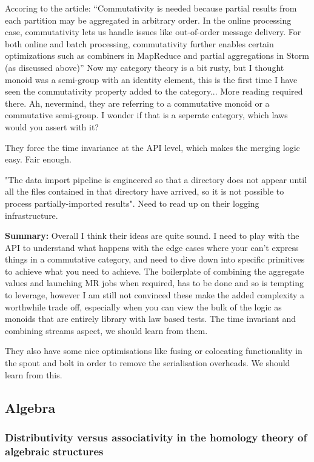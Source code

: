 \documentclass{article}
\begin{document}
Accoring to the article: ``Commutativity is needed because partial results from each partition may be aggregated in arbitrary order.
In the online processing case, commutativity lets us handle issues like out-of-order message delivery. For both online and batch processing, commutativity further enables certain optimizations such as combiners in MapReduce and partial aggregations in Storm (as discussed above)'' Now my category theory is a bit rusty, but I thought monoid was a semi-group with an identity element, this is the first time I have seen the commutativity property added to the category... More reading required there. Ah, nevermind, they are referring to a commutative monoid or a commutative semi-group. I wonder if that is a seperate category, which laws would you assert with it? 

They force the time invariance at the API level, which makes the merging logic easy. Fair enough. 

"The data import pipeline is engineered so that a directory does not appear until all the files contained in that directory have arrived, so it is not possible to process partially-imported results". Need to read up on their logging infrastructure.

\textbf{Summary:} Overall I think their ideas are quite sound. I need to play with the API to understand what happens with the edge cases where your can't express things in a commutative category, and need to dive down into specific primitives to achieve what you need to achieve. The boilerplate of combining the aggregate values and launching MR jobs when required, has to be done and so is tempting to leverage, however I am still not convinced these make the added complexity a worthwhile trade off, especially when you can view the bulk of the logic as monoids that are entirely library with law based tests. The time invariant and combining streams aspect, we should learn from them.

They also have some nice optimisations like fusing or colocating functionality in the spout and bolt in order to remove the serialisation overheads. We should learn from this.

\subsection{Algebra}

\subsubsection{Distributivity versus associativity in the homology theory of algebraic structures}
\end{document}
